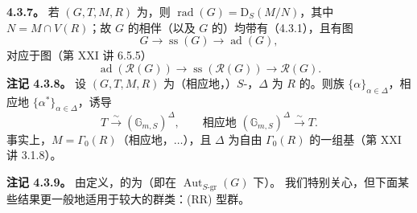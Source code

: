 \textbf{4.3.7。} 若 $(G,T,M,R)$ 为，则 $\operatorname{rad}(G)=\mathrm D_S(M/N)$，其中 $N=M\cap V(R)$；故 $G$ 的相伴（以及 $G$ 的）均带有（4.3.1），且有图
\[G\longrightarrow\operatorname{ss}(G)\longrightarrow\operatorname{ad}(G),\]
对应于图（第 XXI 讲 6.5.5）
\[\operatorname{ad}(\mathcal R(G))\longrightarrow\operatorname{ss}(\mathcal R(G))\longrightarrow\mathcal R(G).\]
\textbf{注记 4.3.8。} 设 $(G,T,M,R)$ 为（相应地，）$S$-，$\Delta$ 为 $R$ 的。则族 $\{\alpha\}_{\alpha\in\Delta}$，相应地 $\{\alpha^*\}_{\alpha\in\Delta}$，诱导
\[T\xrightarrow\sim(\mathbb G_{m,S})^\Delta,\qquad\text{相应地 }(\mathbb G_{m,S})^\Delta\xrightarrow\sim T.\]
事实上，$M=\Gamma_0(R)$（相应地，$\ldots$），且 $\Delta$ 为自由 $\Gamma_0(R)$ 的一组基（第 XXI 讲 3.1.8）。

\textbf{注记 4.3.9。} 由定义，的为（即在 $\operatorname{Aut}_{S\text{-gr}}(G)$ 下）。
我们特别关心，但下面某些结果更一般地适用于较大的群类：(RR) 型群。

